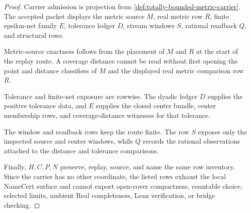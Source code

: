 \begin{proof}
Carrier admission is projection from \autoref{def:totally-bounded-metric-carrier}. The accepted packet displays the metric source $M$, real metric row $R$, finite epsilon-net family $E$, tolerance ledger $D$, stream windows $S$, rational readback $Q$, and structural rows.

Metric-source exactness follows from the placement of $M$ and $R$ at the start of the replay route. A coverage distance cannot be read without first opening the point and distance classifiers of $M$ and the displayed real metric comparison row $R$.

Tolerance and finite-net exposure are rowwise. The dyadic ledger $D$ supplies the positive tolerance data, and $E$ supplies the closed center bundle, center membership rows, and coverage-distance witnesses for that tolerance.

The window and readback rows keep the route finite. The row $S$ exposes only the inspected source and center windows, while $Q$ records the rational observations attached to the distance and tolerance comparisons.

Finally, $H,C,P,N$ preserve, replay, source, and name the same row inventory. Since the carrier has no other coordinate, the listed rows exhaust the local NameCert surface and cannot export open-cover compactness, countable choice, selected limits, ambient Real completeness, Lean verification, or bridge checking.
\end{proof}

